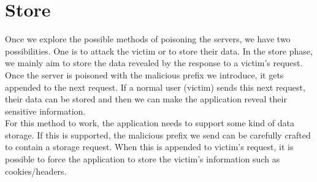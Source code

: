 \section{Store}
Once we explore the possible methods of poisoning the servers, we have two possibilities. One is to attack the victim or to store their data. In the store phase, we mainly aim to store the data revealed by the response to a victim's request. Once the server is poisoned with the malicious prefix we introduce, it gets appended to the next request. If a normal user (victim) sends this next request, their data can be stored and then we can make the application reveal their sensitive information. \\
For this method to work, the application needs to support some kind of data storage. If this is supported, the malicious prefix we send can be carefully crafted to contain a storage request. When this is appended to victim's request, it is possible to force the application to store the victim's information such as cookies/headers. 
